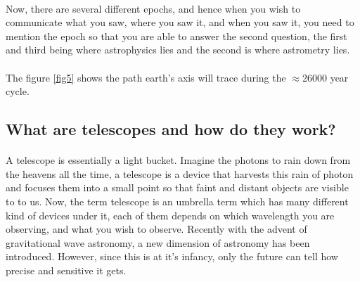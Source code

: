 \documentclass[a4paper,twoside]{article}
\numberwithin{equation}{section}
\begin{document}
\paragraph{}
Now, there are several different epochs, and hence when you wish to communicate what you saw, where you saw it, and when you saw it, you need to mention the epoch so that you are able to answer the second question, the first and third being where astrophysics lies and the second is where astrometry lies. \\
\paragraph{}
The figure \ref{fig5} shows the path earth's axis will trace during the $\approx$26000 year cycle. 
\subsection{What are telescopes and how do they work?}
\paragraph{}
A telescope is essentially a light bucket. Imagine the photons to rain down from the heavens all the time, a telescope is a device that harvests this rain of photon and focuses them into a small point so that faint and distant objects are visible to to us. Now, the term telescope is an umbrella term which has many different kind of devices under it, each of them depends on which wavelength you are observing, and what you wish to observe. Recently with the advent of gravitational wave astronomy, a new dimension of astronomy has been introduced. However, since this is at it's infancy, only the future can tell how precise and sensitive it gets.
\end{document}
